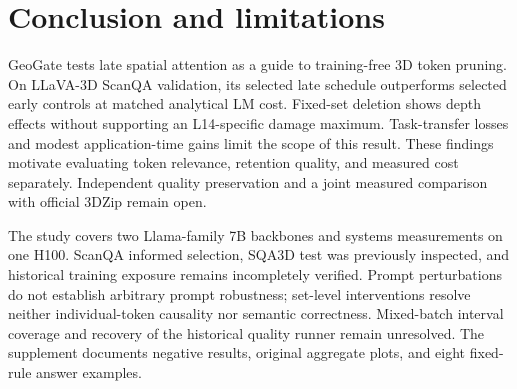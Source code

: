 \section{Conclusion and limitations}
GeoGate tests late spatial attention as a guide to training-free 3D token pruning. On LLaVA-3D ScanQA validation, its selected late schedule outperforms selected early controls at matched analytical LM cost. Fixed-set deletion shows depth effects without supporting an L14-specific damage maximum. Task-transfer losses and modest application-time gains limit the scope of this result. These findings motivate evaluating token relevance, retention quality, and measured cost separately. Independent quality preservation and a joint measured comparison with official 3DZip remain open.

The study covers two Llama-family 7B backbones and systems measurements on one H100. ScanQA informed selection, SQA3D test was previously inspected, and historical training exposure remains incompletely verified. Prompt perturbations do not establish arbitrary prompt robustness; set-level interventions resolve neither individual-token causality nor semantic correctness. Mixed-batch interval coverage and recovery of the historical quality runner remain unresolved. The supplement documents negative results, original aggregate plots, and eight fixed-rule answer examples.\label{maintext:end}
